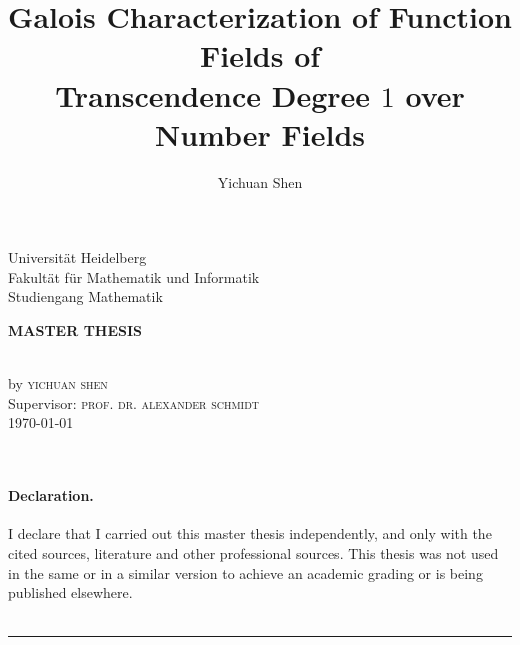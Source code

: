 \documentclass[11pt, a4paper, openany]{memoir}
\author{Yichuan Shen}
\title{Galois Characterization of Function Fields of \\ Transcendence Degree $1$ over Number Fields}
\begin{document}
\theoremstyle{plain}
\theoremstyle{definition}
\newtheorem{theorem}{Theorem}[chapter]
\newtheorem{lemma}[theorem]{Lemma}
\newtheorem{proposition}[theorem]{Proposition}
\newtheorem{corollary}[theorem]{Corollary}
\theoremstyle{definition}
\newtheorem*{definition}{Definition}
\newtheorem*{example}{Example}
\theoremstyle{remark}
\newtheorem{remark}[theorem]{Remark}
\newtheorem{step}{Step}

\frontmatter
{}

\makeatletter
\begin{center}
\vspace*{0cm}
\begin{large}
Universität Heidelberg\\
Fakultät für Mathematik und Informatik\\
Studiengang Mathematik\\
\vspace{8mm}
\end{large}
\vfill
\begin{large}
\textbf{MASTER THESIS}\\
\end{large}
\vspace{10mm}
\linespread{2}\selectfont
\begin{huge}\@title \end{huge}\\
\linespread{1.1}\selectfont
\vspace{10mm}
by \textsc{yichuan shen}\\
\vspace{3cm}
\vfill
Supervisor: \textsc{prof. dr. alexander schmidt}\\
\today
\end{center}
\makeatother

\clearpage
\
\clearpage

\vspace*{0cm}
\vfill
\paragraph{Declaration.} I declare that I carried out this master thesis independently, and only with the cited sources, literature and other professional sources. This thesis was not used in the same or in a similar version to achieve an academic grading or is being published elsewhere.\\
\vspace{7mm}\\
\rule{7cm}{0.4pt}
\clearpage
\end{document}
